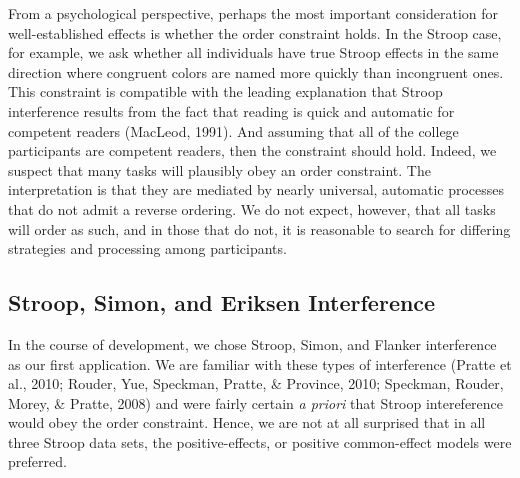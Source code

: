 \documentclass[american,man]{apa6}
\begin{document}
From a psychological perspective, perhaps the most important
consideration for well-established effects is whether the order
constraint holds. In the Stroop case, for example, we ask whether all
individuals have true Stroop effects in the same direction where
congruent colors are named more quickly than incongruent ones. This
constraint is compatible with the leading explanation that Stroop
interference results from the fact that reading is quick and automatic
for competent readers (MacLeod, 1991). And assuming that all of the
college participants are competent readers, then the constraint should
hold. Indeed, we suspect that many tasks will plausibly obey an order
constraint. The interpretation is that they are mediated by nearly
universal, automatic processes that do not admit a reverse ordering. We
do not expect, however, that all tasks will order as such, and in those
that do not, it is reasonable to search for differing strategies and
processing among participants.

\subsection{Stroop, Simon, and Eriksen
Interference}\label{stroop-simon-and-eriksen-interference}

In the course of development, we chose Stroop, Simon, and Flanker
interference as our first application. We are familiar with these types
of interference (Pratte et al., 2010; Rouder, Yue, Speckman, Pratte, \&
Province, 2010; Speckman, Rouder, Morey, \& Pratte, 2008) and were
fairly certain \emph{a priori} that Stroop intereference would obey the
order constraint. Hence, we are not at all surprised that in all three
Stroop data sets, the positive-effects, or positive common-effect models
were preferred.
\end{document}
